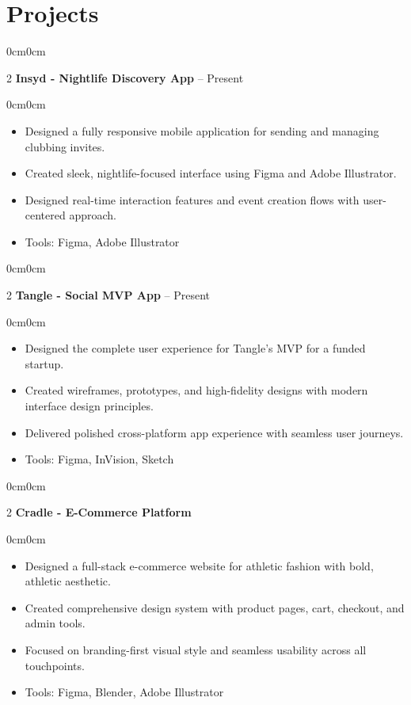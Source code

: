 \documentclass[10pt, letterpaper]{article}
\newenvironment{highlights}{\begin{itemize}[topsep=0.10 cm, parsep=0.10 cm, partopsep=0pt, itemsep=0pt, leftmargin=10pt]}{\end{itemize}}
\newenvironment{onecolentry}{\begin{adjustwidth}{0cm}{0cm}}{\end{adjustwidth}}
\newenvironment{twocolentry}[2][]{\onecolentry\def\secondColumn{#2}\setcolumnwidth{\fill, 4.5 cm}\begin{paracol}{2}}{\switchcolumn \raggedleft \secondColumn\end{paracol}\endonecolentry}
\begin{document}
\section{Projects}

\begin{twocolentry}{2024 -- Present}
    \textbf{Insyd - Nightlife Discovery App}
\end{twocolentry}
\vspace{0.2cm}
\begin{onecolentry}
    \begin{highlights}
        \item Designed a fully responsive mobile application for sending and managing clubbing invites.
        \item Created sleek, nightlife-focused interface using Figma and Adobe Illustrator.
        \item Designed real-time interaction features and event creation flows with user-centered approach.
        \item Tools: Figma, Adobe Illustrator
    \end{highlights}
\end{onecolentry}

\vspace{0.2cm}
\begin{twocolentry}{2024 -- Present}
    \textbf{Tangle - Social MVP App}
\end{twocolentry}
\vspace{0.2cm}
\begin{onecolentry}
    \begin{highlights}
        \item Designed the complete user experience for Tangle's MVP for a funded startup.
        \item Created wireframes, prototypes, and high-fidelity designs with modern interface design principles.
        \item Delivered polished cross-platform app experience with seamless user journeys.
        \item Tools: Figma, InVision, Sketch
    \end{highlights}
\end{onecolentry}

\vspace{0.2cm}
\begin{twocolentry}{2022}
    \textbf{Cradle - E-Commerce Platform}
\end{twocolentry}
\vspace{0.2cm}
\begin{onecolentry}
    \begin{highlights}
        \item Designed a full-stack e-commerce website for athletic fashion with bold, athletic aesthetic.
        \item Created comprehensive design system with product pages, cart, checkout, and admin tools.
        \item Focused on branding-first visual style and seamless usability across all touchpoints.
        \item Tools: Figma, Blender, Adobe Illustrator
    \end{highlights}
\end{onecolentry}
\end{document}
